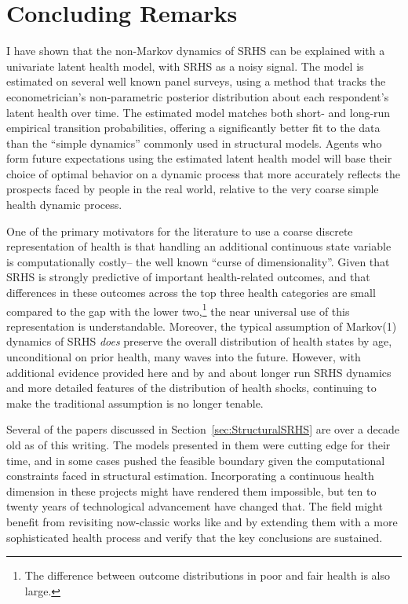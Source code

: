 \documentclass[12pt,pdftex,letterpaper]{article}
\begin{document}
\section{Concluding Remarks}\label{sec:Conclusion}

I have shown that the non-Markov dynamics of SRHS can be explained with a univariate latent health model, with SRHS as a noisy signal.  The model is estimated on several well known panel surveys, using a method that tracks the econometrician's non-parametric posterior distribution about each respondent's latent health over time.  The estimated model matches both short- and long-run empirical transition probabilities, offering a significantly better fit to the data than the ``simple dynamics'' commonly used in structural models. Agents who form future expectations using the estimated latent health model will base their choice of optimal behavior on a dynamic process that more accurately reflects the prospects faced by people in the real world, relative to the very coarse simple health dynamic process.

One of the primary motivators for the literature to use a coarse discrete representation of health is that handling an additional continuous state variable is computationally costly-- the well known ``curse of dimensionality''. Given that SRHS is strongly predictive of important health-related outcomes, and that differences in these outcomes across the top three health categories are small compared to the gap with the lower two,\footnote{The difference between outcome distributions in poor and fair health is also large.} the near universal use of this representation is understandable. Moreover, the typical assumption of Markov(1) dynamics of SRHS \textit{does} preserve the overall distribution of health states by age, unconditional on prior health, many waves into the future. However, with additional evidence provided here and by \cite{DeNardi18} and \cite{HosseiniZhao21a} about longer run SRHS dynamics and more detailed features of the distribution of health shocks, continuing to make the traditional assumption is no longer tenable.

Several of the papers discussed in Section~\ref{sec:StructuralSRHS} are over a decade old as of this writing. The models presented in them were cutting edge for their time, and in some cases pushed the feasible boundary given the computational constraints faced in structural estimation. Incorporating a continuous health dimension in these projects might have rendered them impossible, but ten to twenty years of technological advancement have changed that. The field might benefit from revisiting now-classic works like \cite{RustPhelan97} and \cite{BlauGilleskie08} by extending them with a more sophisticated health process and verify that the key conclusions are sustained.



\end{document}
